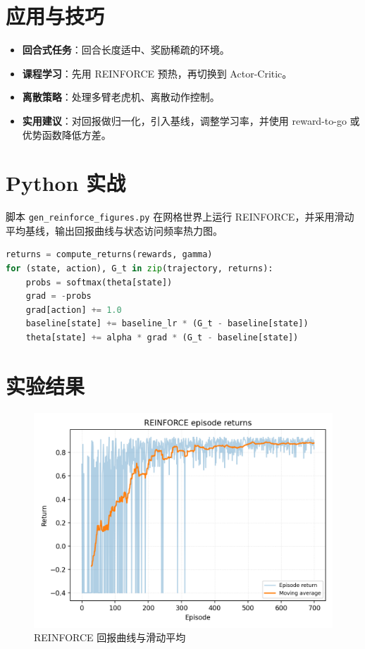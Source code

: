 \documentclass[UTF8,zihao=-4]{ctexart}
\begin{document}
\section{应用与技巧}
\begin{itemize}
  \item \textbf{回合式任务}：回合长度适中、奖励稀疏的环境。
  \item \textbf{课程学习}：先用 REINFORCE 预热，再切换到 Actor-Critic。
  \item \textbf{离散策略}：处理多臂老虎机、离散动作控制。
  \item \textbf{实用建议}：对回报做归一化，引入基线，调整学习率，并使用 reward-to-go 或优势函数降低方差。
\end{itemize}

\section{Python 实战}
脚本 \texttt{gen\_reinforce\_figures.py} 在网格世界上运行 REINFORCE，并采用滑动平均基线，输出回报曲线与状态访问频率热力图。
\begin{lstlisting}[language=Python,caption={脚本 gen_reinforce_figures.py 片段}]
returns = compute_returns(rewards, gamma)
for (state, action), G_t in zip(trajectory, returns):
    probs = softmax(theta[state])
    grad = -probs
    grad[action] += 1.0
    baseline[state] += baseline_lr * (G_t - baseline[state])
    theta[state] += alpha * grad * (G_t - baseline[state])
\end{lstlisting}

\section{实验结果}
\begin{figure}[H]
  \centering
  \includegraphics[width=0.8\linewidth]{reinforce_returns.png}
  \caption{REINFORCE 回报曲线与滑动平均}
  \label{fig:reinforce_returns_cn}
\end{figure}
\end{document}
